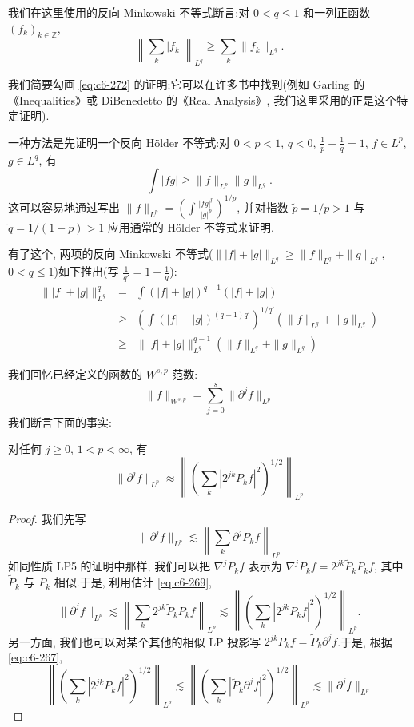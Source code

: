 我们在这里使用的反向 Minkowski 不等式断言:对 $0 < q \leq 1$ 和一列正函数 $(f_k)_{k \in \mathbb{Z}}$,
\begin{equation}
\left\|\sum_k |f_k|\right\|_{L^q} \geq \sum_k \|f_k\|_{L^q}.\label{eq:c6-272}
\end{equation}

我们简要勾画 \eqref{eq:c6-272} 的证明;它可以在许多书中找到(例如 Garling 的《Inequalities》或 DiBenedetto 的《Real Analysis》, 我们这里采用的正是这个特定证明).

一种方法是先证明一个反向 Hölder 不等式:对 $0 < p < 1$, $q < 0$, $\frac{1}{p} + \frac{1}{q} = 1$, $f \in L^p$, $g \in L^q$, 有
\[
\int |fg| \geq \|f\|_{L^p} \|g\|_{L^q}.
\]
这可以容易地通过写出 $\|f\|_{L^p} = \left(\int \frac{|fg|^p}{|g|^p}\right)^{1/p}$, 并对指数 $\tilde{p} = 1/p > 1$ 与 $\tilde{q} = 1/(1-p) > 1$ 应用通常的 Hölder 不等式来证明.

有了这个, 两项的反向 Minkowski 不等式($\||f| + |g|\|_{L^q} \geq \|f\|_{L^q} + \|g\|_{L^q}$, $0 < q \leq 1$)如下推出(写 $\frac{1}{q'} = 1 - \frac{1}{q}$):
\[
\begin{array}{rcl}
\||f| + |g|\|^q_{L^q} &=& \int (|f| + |g|)^{q-1} (|f| + |g|) \\
&\geq& \left(\int (|f| + |g|)^{(q-1)q'}\right)^{1/q'} (\|f\|_{L^q} + \|g\|_{L^q}) \\
&\geq& \||f| + |g|\|^{q-1}_{L^q} (\|f\|_{L^q} + \|g\|_{L^q})
\end{array}
\]


我们回忆已经定义的函数的 $W^{s, p}$ 范数:
\[
\|f\|_{W^{s, p}} = \sum_{j=0}^s \|\partial^j f\|_{L^p}
\]
我们断言下面的事实:

\begin{lemma}\label{lem:c6-6.17}
对任何 $j \geq 0$, $1 < p < \infty$, 有
\[
\|\partial^j f\|_{L^p} \approx \left\|\left(\sum_k |2^{jk} P_k f|^2\right)^{1/2}\right\|_{L^p}
\]
\end{lemma}

\begin{proof}
我们先写
\[
\|\partial^j f\|_{L^p} \lesssim \left\|\sum_k \partial^j P_k f\right\|_{L^p}
\]
如同性质 LP5 的证明中那样, 我们可以把 $\nabla^j P_k f$ 表示为 $\nabla^j P_k f = 2^{jk} \tilde{P}_k P_k f$, 其中 $\tilde{P}_k$ 与 $P_k$ 相似.于是, 利用估计 \eqref{eq:c6-269},
\[
\|\partial^j f\|_{L^p} \lesssim \left\|\sum_k 2^{jk} \tilde{P}_k P_k f\right\|_{L^p} \lesssim \left\|\left(\sum_k |2^{jk} P_k f|^2\right)^{1/2}\right\|_{L^p}.
\]
另一方面, 我们也可以对某个其他的相似 LP 投影写 $2^{jk} P_k f = \tilde{P}_k \partial^j f$.于是, 根据 \eqref{eq:c6-267},
\[
\left\|\left(\sum_k |2^{jk} P_k f|^2\right)^{1/2}\right\|_{L^p} \lesssim \left\|\left(\sum_k |\tilde{P}_k \partial^j f|^2\right)^{1/2}\right\|_{L^p} \lesssim \|\partial^j f\|_{L^p}
\]
\end{proof}

